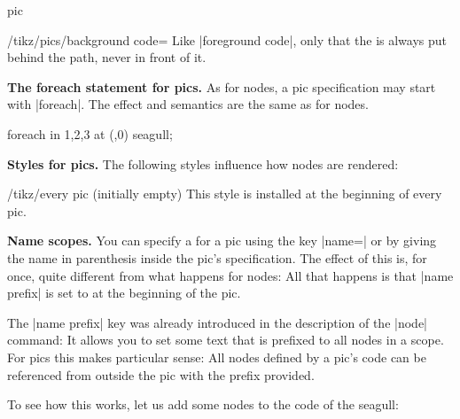 \begin{pathoperation}{pic}{%
    }
  \begin{key}{/tikz/pics/background code=}
    Like |foreground code|, only that the  is always put
    behind the path, never in front of it.
  \end{key}
  
  \medskip
  \textbf{The foreach statement for pics.}
  As for nodes, a pic specification may start with |foreach|. The
  effect and semantics are the same as for nodes.
\begin{codeexample}[]
\tikz \pic foreach \x in {1,2,3} at (\x,0) {seagull};
\end{codeexample}

  \medskip
  \textbf{Styles for pics.}
  The following styles influence how nodes are rendered:
  \begin{stylekey}{/tikz/every pic (initially \normalfont empty)}
    This style is installed at the beginning of every pic.
\begin{codeexample}[]
\end{codeexample}
  \end{stylekey}

  
  \medskip
  \textbf{Name scopes.}
  You can specify a  for a pic using the key
  |name=| or by giving the name in parenthesis inside the
  pic's specification. The effect of this is, for once, quite
  different from what happens for nodes: All that happens is that
  |name prefix| is set to  at the beginning of the pic.
  
  The |name prefix| key was already introduced in the description of
  the |node| command: It allows you to set some text that is prefixed
  to all nodes in a scope. For pics this makes particular sense: All
  nodes defined by a pic's code can be referenced from outside the pic
  with the prefix provided.

  To see how this works, let us add some nodes to the code of the
  seagull:
\begin{codeexample}
\end{codeexample}
\end{pathoperation}

